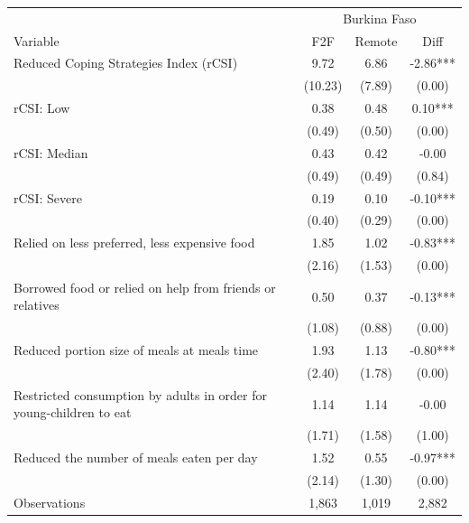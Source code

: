 \begin{tabular}{l*{3}c}
\hline\hline
 & \multicolumn{3}{c}{Burkina Faso}\\ 
Variable & F2F & Remote & Diff \\
\hline
Reduced Coping Strategies Index (rCSI)&9.72&6.86&-2.86***\\
&(10.23)&(7.89)&(0.00)\\
rCSI: Low&0.38&0.48&0.10***\\
&(0.49)&(0.50)&(0.00)\\
rCSI: Median&0.43&0.42&-0.00\\
&(0.49)&(0.49)&(0.84)\\
rCSI: Severe&0.19&0.10&-0.10***\\
&(0.40)&(0.29)&(0.00)\\
Relied on less preferred, less expensive food&1.85&1.02&-0.83***\\
&(2.16)&(1.53)&(0.00)\\
Borrowed food or relied on help from friends or relatives&0.50&0.37&-0.13***\\
&(1.08)&(0.88)&(0.00)\\
Reduced portion size of meals at meals time&1.93&1.13&-0.80***\\
&(2.40)&(1.78)&(0.00)\\
Restricted consumption by adults in order for young-children to eat&1.14&1.14&-0.00\\
&(1.71)&(1.58)&(1.00)\\
Reduced the number of meals eaten per day&1.52&0.55&-0.97***\\
&(2.14)&(1.30)&(0.00)\\
\hline
Observations & 1,863 & 1,019 & 2,882 \\
\hline\hline
\end{tabular}
